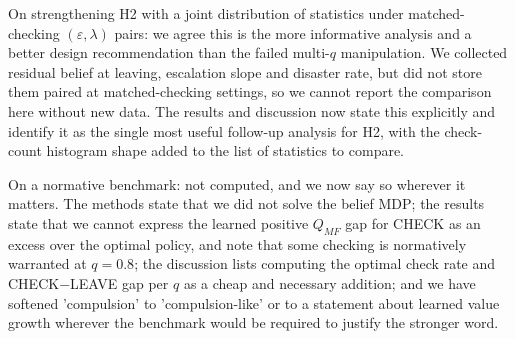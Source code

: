 \documentclass[11pt,a4paper]{article}
\begin{document}
On strengthening H2 with a joint distribution of statistics under matched-checking $(\varepsilon,\lambda)$ pairs: we agree this is the more informative analysis and a better design recommendation than the failed multi-$q$ manipulation. We collected residual belief at leaving, escalation slope and disaster rate, but did not store them paired at matched-checking settings, so we cannot report the comparison here without new data. The results and discussion now state this explicitly and identify it as the single most useful follow-up analysis for H2, with the check-count histogram shape added to the list of statistics to compare.

On a normative benchmark: not computed, and we now say so wherever it matters. The methods state that we did not solve the belief MDP; the results state that we cannot express the learned positive $Q_{MF}$ gap for CHECK as an excess over the optimal policy, and note that some checking is normatively warranted at $q=0.8$; the discussion lists computing the optimal check rate and CHECK$-$LEAVE gap per $q$ as a cheap and necessary addition; and we have softened 'compulsion' to 'compulsion-like' or to a statement about learned value growth wherever the benchmark would be required to justify the stronger word.
\end{document}
